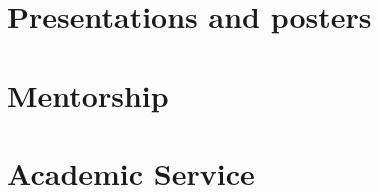 \documentclass[14pt]{prometheus_cv}
\begin{document}
\section{Presentations and posters}



\section{Mentorship}



\section{Academic Service}



%
\end{document}
